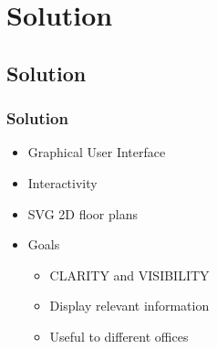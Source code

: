 \documentclass[hyperref={pdfpagelabels=false}]{beamer}
\begin{document}
\section{Solution} 
\hypertarget{Solution}{{}}
\subsection{Solution}
\begin{frame}
\frametitle{Solution}
\begin{itemize}[<+->]
	\item Graphical User Interface
	\item Interactivity
	\item SVG 2D floor plans 
	\item {\Large Goals}
	\begin{itemize}
		\item CLARITY and VISIBILITY
		\item Display relevant information
		\item Useful to different offices 
	\end{itemize}
\end{itemize}
\end{frame}
\end{document}
